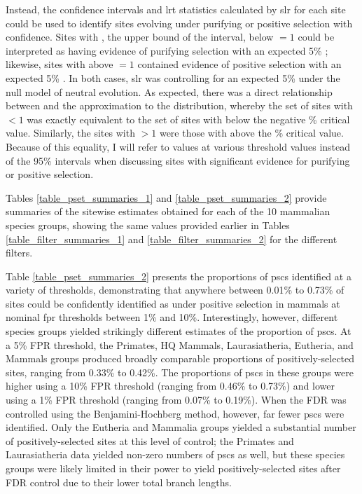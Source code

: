 Instead, the confidence intervals and \ac{lrt} statistics calculated
by \ac{slr} for each site could be used to identify sites evolving
under purifying or positive selection with confidence. Sites with
\ciup, the upper bound of the \ci interval, below \omg$=1$ could be
interpreted as having evidence of purifying selection with an expected
5\% \fpr; likewise, sites with \cidown above \omg$=1$ contained
evidence of positive selection with an expected 5\% \fpr. In both
cases, \ac{slr} was controlling for an expected 5\% \fpr under the
null model of neutral evolution. As expected, there was a direct
relationship between \ciup and the \chisq approximation to the \slrt
distribution, whereby the set of sites with \ciup$<1$ was exactly
equivalent to the set of sites with \slrt below the negative \% critical value. Similarly, the sites with \cidown$>1$ were those
with \slrt above the \% critical value. Because of this
equality, I will refer to \slrt values at various \chisq threshold
values instead of the 95\% \ci intervals when discussing sites with
significant evidence for purifying or positive selection.

Tables \ref{table_pset_summaries_1} and \ref{table_pset_summaries_2}
provide summaries of the sitewise estimates obtained for each of the
10 mammalian species groups, showing the same values provided earlier
in Tables \ref{table_filter_summaries_1} and
\ref{table_filter_summaries_2} for the different filters.

Table \ref{table_pset_summaries_2} presents the proportions of
\acp{psc} identified at a variety of \slrt thresholds, demonstrating
that anywhere between 0.01\% to 0.73\% of sites could be confidently
identified as under positive selection in mammals at nominal \ac{fpr}
thresholds between 1\% and 10\%. Interestingly, however, different
species groups yielded strikingly different estimates of the
proportion of \acp{psc}. At a 5\% FPR threshold, the Primates, HQ
Mammals, Laurasiatheria, Eutheria, and Mammals groups produced broadly
comparable proportions of positively-selected sites, ranging from
0.33\% to 0.42\%. The proportions of \acp{psc} in these groups were
higher using a 10\% FPR threshold (ranging from 0.46\% to 0.73\%) and
lower using a 1\% FPR threshold (ranging from 0.07\% to 0.19\%). When
the FDR was controlled using the Benjamini-Hochberg method, however,
far fewer \acp{psc} were identified. Only the Eutheria and Mammalia
groups yielded a substantial number of positively-selected sites at
this level of control; the Primates and Laurasiatheria data yielded
non-zero numbers of \acp{psc} as well, but these species groups were
likely limited in their power to yield positively-selected sites after
FDR control due to their lower total branch lengths.


